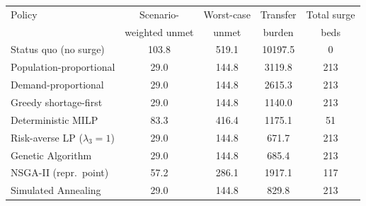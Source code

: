 ﻿\begin{tabular}{lcccc}
\toprule
Policy & Scenario- & Worst-case & Transfer & Total surge\\
       & weighted unmet & unmet & burden   & beds\\
\midrule
Status quo (no surge) & 103.8 & 519.1 & 10197.5 & 0 \\
Population-proportional & 29.0 & 144.8 & 3119.8 & 213 \\
Demand-proportional & 29.0 & 144.8 & 2615.3 & 213 \\
Greedy shortage-first & 29.0 & 144.8 & 1140.0 & 213 \\
Deterministic MILP & 83.3 & 416.4 & 1175.1 & 51 \\
Risk-averse LP ($\lambda_3{=}1$) & 29.0 & 144.8 & 671.7 & 213 \\
\midrule
Genetic Algorithm & 29.0 & 144.8 & 685.4 & 213 \\
NSGA-II (repr.\ point) & 57.2 & 286.1 & 1917.1 & 117 \\
Simulated Annealing & 29.0 & 144.8 & 829.8 & 213 \\
\bottomrule
\end{tabular}
